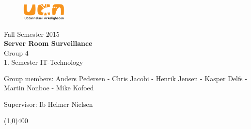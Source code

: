 \clearpage
\thispagestyle{empty}

\begin{figure}[H]
	\raggedleft
		\includegraphics[width=0.2\textwidth]{figures/logo-ucn.png}
\end{figure}
\vspace*{\fill} 
\begin{center}
\begin{Huge}
Fall Semester 2015\\
\vspace{5 mm}
\textbf{Server Room Surveillance}\\
\vspace{3 mm}
Group 4\\
\vspace{3 mm}
1. Semester IT-Technology
\end{Huge}
\end{center}
\vspace*{\fill}
\begin{center}
Group members:
 Anders Pedersen - Chris Jacobi - Henrik Jensen - Kasper Delfs - Martin Nonboe - Mike Kofoed
\end{center}
\begin{center}
Supervisor: Ib Helmer Nielsen
\end{center}
\begin{center}
\line(1,0){400}
\end{center}